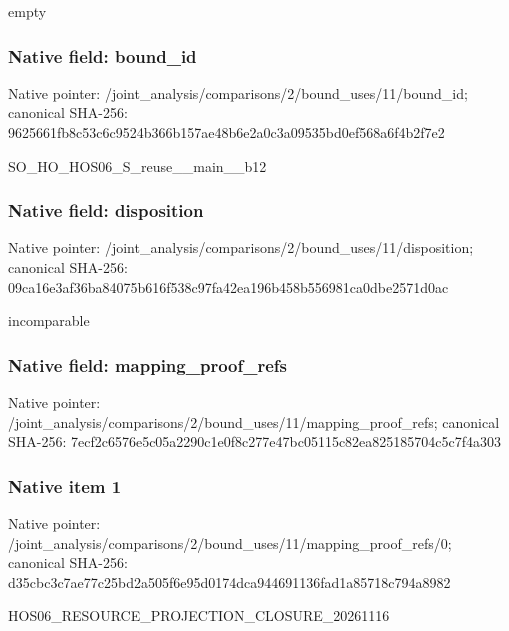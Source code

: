 \documentclass[10pt,a4paper]{article}
\begin{document}
\begingroup\raggedright\sloppy empty\par\endgroup

\subsubsection{Native field: bound\_\allowbreak{}id}
Native pointer: /joint\_\allowbreak{}analysis/comparisons/2/bound\_\allowbreak{}uses/11/bound\_\allowbreak{}id; canonical SHA-256: 9625661fb8c53c6c9524b366b157ae48b6e2a0c3a09535bd0ef568a6f4b2f7e2

\begingroup\raggedright\sloppy SO\_\allowbreak{}HO\_\allowbreak{}HOS06\_\allowbreak{}S\_\allowbreak{}reuse\_\allowbreak{}\_\allowbreak{}main\_\allowbreak{}\_\allowbreak{}b12\par\endgroup

\subsubsection{Native field: disposition}
Native pointer: /joint\_\allowbreak{}analysis/comparisons/2/bound\_\allowbreak{}uses/11/disposition; canonical SHA-256: 09ca16e3af36ba84075b616f538c97fa42ea196b458b556981ca0dbe2571d0ac

\begingroup\raggedright\sloppy incomparable\par\endgroup

\subsubsection{Native field: mapping\_\allowbreak{}proof\_\allowbreak{}refs}
Native pointer: /joint\_\allowbreak{}analysis/comparisons/2/bound\_\allowbreak{}uses/11/mapping\_\allowbreak{}proof\_\allowbreak{}refs; canonical SHA-256: 7ecf2c6576e5c05a2290c1e0f8c277e47bc05115c82ea825185704c5c7f4a303

\subsubsection{Native item 1}
Native pointer: /joint\_\allowbreak{}analysis/comparisons/2/bound\_\allowbreak{}uses/11/mapping\_\allowbreak{}proof\_\allowbreak{}refs/0; canonical SHA-256: d35cbc3c7ae77c25bd2a505f6e95d0174dca944691136fad1a85718c794a8982

\begingroup\raggedright\sloppy HOS06\_\allowbreak{}RESOURCE\_\allowbreak{}PROJECTION\_\allowbreak{}CLOSURE\_\allowbreak{}20261116\par\endgroup
\end{document}
